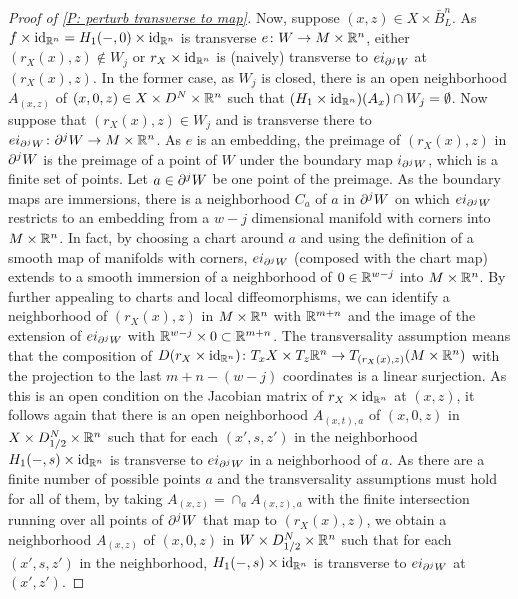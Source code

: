 \begin{proof}[Proof of \cref{P: perturb transverse to map}]
	Now, suppose $(x,z) \in X \times \bar B^n_L$.
	As $f \times \mathrm{id}_{\mathbb{R}^n} = H_1(-,0) \times \mathrm{id}_{\mathbb{R}^n}$ is transverse $e \colon W \to M \times \mathbb{R}^n$, either $(r_X(x),z)\notin W_j$ or $r_X \times \mathrm{id}_{\mathbb{R}^n}$ is (naively) transverse to $ei_{\partial^jW}$ at $(r_X(x),z)$.
	In the former case, as $W_j$ is closed, there is an open neighborhood $A_{(x,z)}$ of $(x,0,z) \in X \times D^N \times \mathbb{R}^n$ such that $(H_1 \times \mathrm{id}_{\mathbb{R}^n})(A_x) \cap W_j = \emptyset$.
	Now suppose that $(r_X(x),z) \in W_j$ and is transverse there to $ei_{\partial^jW} \colon \partial^jW \to M \times \mathbb{R}^n$.
	As $e$ is an embedding, the preimage of $(r_X(x),z)$ in $\partial^jW$ is the preimage of a point of $W$ under the boundary map $i_{\partial^jW}$, which is a finite set of points.
	Let $a \in \partial^jW$ be one point of the preimage.
	As the boundary maps are immersions, there is a neighborhood $C_a$ of $a$ in $\partial^jW$ on which $ei_{\partial^jW}$ restricts to an embedding from a $w-j$ dimensional manifold with corners into $M \times \mathbb{R}^n$.
	In fact, by choosing a chart around $a$ and using the definition of a smooth map of manifolds with corners, $ei_{\partial^jW}$ (composed with the chart map) extends to a smooth immersion of a neighborhood of $0 \in \mathbb{R}^{w-j}$ into $M \times \mathbb{R}^n$.
	By further appealing to charts and local diffeomorphisms, we can identify a neighborhood of $(r_X(x),z)$ in $M \times \mathbb{R}^n$ with $\mathbb{R}^{m+n}$ and the image of the extension of $ei_{\partial^jW}$ with $\mathbb{R}^{w-j} \times 0 \subset \mathbb{R}^{m+n}$.
	The transversality assumption means that the composition of $D(r_X \times \mathrm{id}_{\mathbb{R}^n}) \colon T_xX \times T_z\mathbb{R}^n
	\to T_{(r_X(x),z)}(M \times \mathbb{R}^n)$ with the projection to the last $m+n-(w-j)$ coordinates is a linear surjection.
	As this is an open condition on the Jacobian matrix of $r_X \times \mathrm{id}_{\mathbb{R}^n}$ at $(x,z)$, it follows again that there is an open neighborhood $A_{(x,t),a}$ of $(x,0,z)$ in $X \times D_{1/2}^N \times \mathbb{R}^n$ such that for each $(x',s,z')$ in the neighborhood $H_1(-,s) \times \mathrm{id}_{\mathbb{R}^n}$ is transverse to $ei_{\partial^jW}$ in a neighborhood of $a$.
	As there are a finite number of possible points $a$ and the transversality assumptions must hold for all of them, by taking $A_{(x,z)} = \cap_a A_{(x,z),a}$ with the finite intersection running over all points of $\partial^jW$ that map to $(r_X(x),z)$, we obtain a neighborhood $A_{(x,z)}$ of $(x,0,z)$ in $W \times D_{1/2}^N \times \mathbb{R}^n$ such that for each $(x',s,z')$ in the neighborhood, $H_1(-,s) \times \mathrm{id}_{\mathbb{R}^n}$ is transverse to $ei_{\partial^jW}$ at $(x',z')$.


\end{proof}
